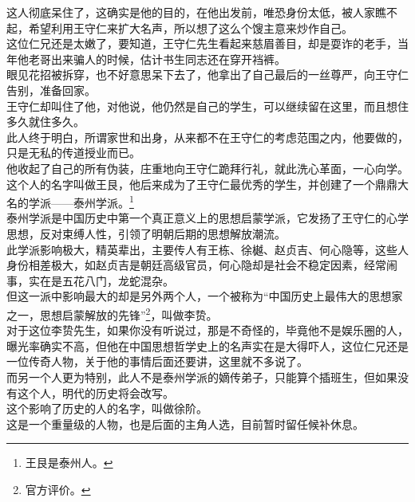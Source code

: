 \begin{multicols}{\theparacolNo}
这人彻底呆住了，这确实是他的目的，在他出发前，唯恐身份太低，被人家瞧不起，希望利用王守仁来扩大名声，所以想了这么个馊主意来炒作自己。\\

这位仁兄还是太嫩了，要知道，王守仁先生看起来慈眉善目，却是耍诈的老手，当年他老哥出来骗人的时候，估计书生同志还在穿开裆裤。\\

眼见花招被拆穿，也不好意思呆下去了，他拿出了自己最后的一丝尊严，向王守仁告别，准备回家。\\

王守仁却叫住了他，对他说，他仍然是自己的学生，可以继续留在这里，而且想住多久就住多久。\\

此人终于明白，所谓家世和出身，从来都不在王守仁的考虑范围之内，他要做的，只是无私的传道授业而已。\\

他收起了自己的所有伪装，庄重地向王守仁跪拜行礼，就此洗心革面，一心向学。\\

这个人的名字叫做王艮，他后来成为了王守仁最优秀的学生，并创建了一个鼎鼎大名的学派——泰州学派。\footnote{王艮是泰州人。}\\

泰州学派是中国历史中第一个真正意义上的思想启蒙学派，它发扬了王守仁的心学思想，反对束缚人性，引领了明朝后期的思想解放潮流。\\

此学派影响极大，精英辈出，主要传人有王栋、徐樾、赵贞吉、何心隐等，这些人身份相差极大，如赵贞吉是朝廷高级官员，何心隐却是社会不稳定因素，经常闹事，实在是五花八门，龙蛇混杂。\\

但这一派中影响最大的却是另外两个人，一个被称为“中国历史上最伟大的思想家之一，思想启蒙解放的先锋”\footnote{官方评价。}，叫做李贽。\\

对于这位李贽先生，如果你没有听说过，那是不奇怪的，毕竟他不是娱乐圈的人，曝光率确实不高，但他在中国思想哲学史上的名声实在是大得吓人，这位仁兄还是一位传奇人物，关于他的事情后面还要讲，这里就不多说了。\\

而另一个人更为特别，此人不是泰州学派的嫡传弟子，只能算个插班生，但如果没有这个人，明代的历史将会改写。\\

这个影响了历史的人的名字，叫做徐阶。\\

这是一个重量级的人物，也是后面的主角人选，目前暂时留任候补休息。\\


\end{multicols}
